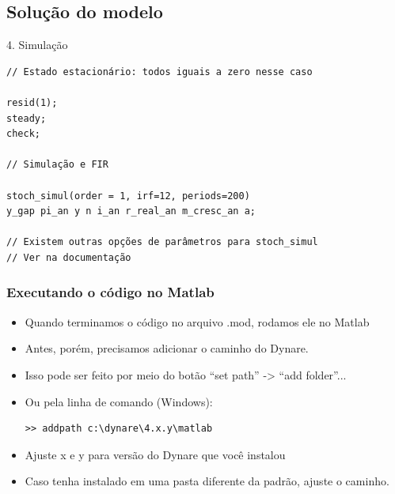 \documentclass[xcolor=pdftex,dvipsnames,table]{beamer}
\newcommand{\ft}{\frametitle}
\begin{document}
\subsection{Solução do modelo}

\begin{frame}[fragile]

\begin{block}{4. Simulação}
	\begin{lstlisting}
// Estado estacionário: todos iguais a zero nesse caso

resid(1);
steady;
check;

// Simulação e FIR

stoch_simul(order = 1, irf=12, periods=200)
y_gap pi_an y n i_an r_real_an m_cresc_an a;

// Existem outras opções de parâmetros para stoch_simul
// Ver na documentação	
	\end{lstlisting}
\end{block}

\end{frame}


\begin{frame}[fragile]
\ft{Executando o código no Matlab}

\begin{itemize}
\item Quando terminamos o código no arquivo .mod, rodamos ele no Matlab

\item Antes, porém, precisamos adicionar o caminho do Dynare.

\item Isso pode ser feito por meio do botão ``set path'' -> ``add folder''...

\item Ou pela linha de comando (Windows):

\begin{lstlisting}
>> addpath c:\dynare\4.x.y\matlab
\end{lstlisting}

\item Ajuste x e y para versão do Dynare que você instalou

\item Caso tenha instalado em uma pasta diferente da padrão, ajuste o caminho.
\end{itemize}

\end{frame}
\end{document}
